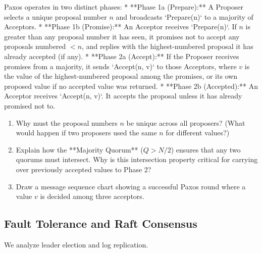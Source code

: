 \documentclass[12pt, a4paper]{book}
\begin{document}
\begin{explobox}
Paxos operates in two distinct phases:
* **Phase 1a (Prepare):** A Proposer selects a unique proposal number $n$ and broadcasts `Prepare(n)` to a majority of Acceptors.
* **Phase 1b (Promise):** An Acceptor receives `Prepare(n)`. If $n$ is greater than any proposal number it has seen, it promises not to accept any proposals numbered $< n$, and replies with the highest-numbered proposal it has already accepted (if any).
* **Phase 2a (Accept):** If the Proposer receives promises from a majority, it sends `Accept(n, v)` to those Acceptors, where $v$ is the value of the highest-numbered proposal among the promises, or its own proposed value if no accepted value was returned.
* **Phase 2b (Accepted):** An Acceptor receives `Accept(n, v)`. It accepts the proposal unless it has already promised not to.
\begin{enumerate}[label=(\alph*), leftmargin=*]
  \item Why must the proposal numbers $n$ be unique across all proposers? (What would happen if two proposers used the same $n$ for different values?)
  \item Explain how the **Majority Quorum** ($Q > N/2$) ensures that any two quorums must intersect.
        Why is this intersection property critical for carrying over previously accepted values to Phase 2?
  \item Draw a message sequence chart showing a successful Paxos round where a value $v$ is decided among three acceptors.
\end{enumerate}
\end{explobox}

\subsection{Fault Tolerance and Raft Consensus}

We analyze leader election and log replication.
\end{document}

